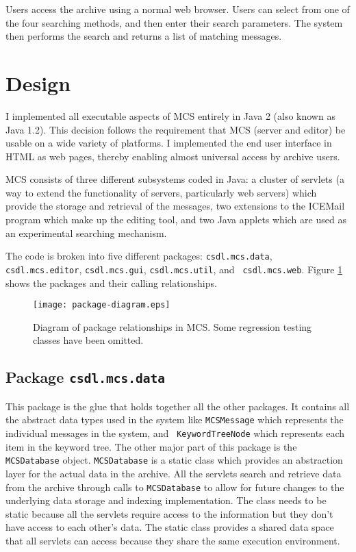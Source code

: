 Users access the archive using a normal web browser. Users can select from one
of the four searching methods, and then enter their search parameters. The
system then performs the search and returns a list of matching messages.

\section{Design}
I implemented all executable aspects of MCS entirely in Java 2 (also known as
Java 1.2). This decision follows the requirement that MCS (server and editor)
be usable on a wide variety of platforms. I implemented the end user interface
in HTML as web pages, thereby enabling almost universal access by archive
users.

MCS consists of three different subsystems coded in Java: a cluster of servlets
(a way to extend the functionality of servers, particularly web servers) which
provide the storage and retrieval of the messages, two extensions to the
ICEMail program which make up the editing tool, and two Java applets which are
used as an experimental searching mechanism.

The code is broken into five different packages: {\tt csdl.mcs.data}, {\tt
csdl.mcs.editor}, {\tt csdl.mcs.gui}, {\tt csdl.mcs.util}, and {\tt
csdl.mcs.web}. Figure \ref{fig:package-diagram} shows the packages and their
calling relationships.

\begin{figure}[htbp]
  \centering
  \texttt{[image: package-diagram.eps]}
  \caption[Diagram of package relationships in MCS.]{Diagram of package relationships in MCS. Some regression testing classes have been omitted.}
  \label{fig:package-diagram}
\end{figure}

\subsection{Package {\tt csdl.mcs.data}}
\label{sec:data-package-design}
This package is the glue that holds together all the other packages. It
contains all the abstract data types used in the system like {\tt MCSMessage}
which represents the individual messages in the system, and {\tt
  KeywordTreeNode} which represents each item in the keyword tree. The other
major part of this package is the {\tt MCSDatabase} object. {\tt MCSDatabase}
is a static class which provides an abstraction layer for the actual data in
the archive. All the servlets search and retrieve data from the archive through
calls to {\tt MCSDatabase} to allow for future changes to the underlying data
storage and indexing implementation. The class needs to be static because all
the servlets require access to the information but they don't have access to
each other's data. The static class provides a shared data space that all
servlets can access because they share the same execution environment.

